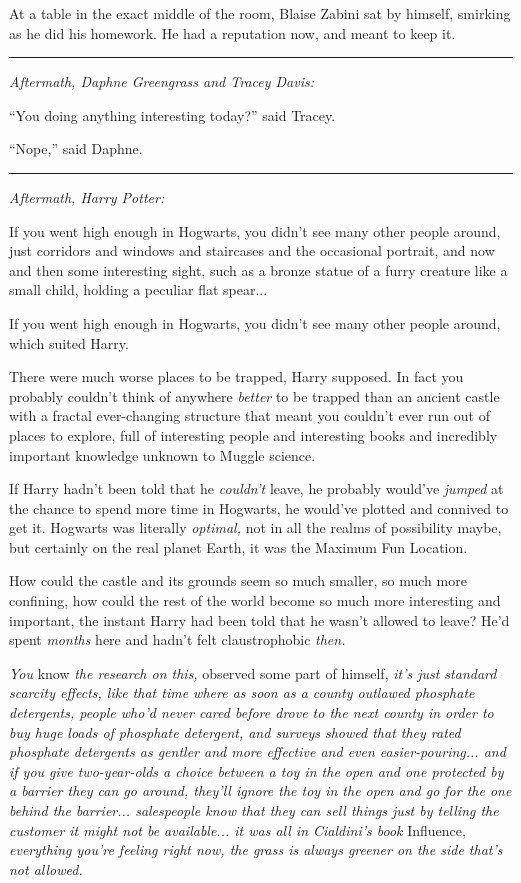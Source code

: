 At a table in the exact middle of the room, Blaise Zabini sat by himself, smirking as he did his homework. He had a reputation now, and meant to keep it.

\begin{center}\rule{3in}{0.4pt}\end{center}

\emph{Aftermath, Daphne Greengrass and Tracey Davis:}

``You doing anything interesting today?'' said Tracey.

``Nope,'' said Daphne.

\begin{center}\rule{3in}{0.4pt}\end{center}

\emph{Aftermath, Harry Potter:}

If you went high enough in Hogwarts, you didn't see many other people around, just corridors and windows and staircases and the occasional portrait, and now and then some interesting sight, such as a bronze statue of a furry creature like a small child, holding a peculiar flat spear...

If you went high enough in Hogwarts, you didn't see many other people around, which suited Harry.

There were much worse places to be trapped, Harry supposed. In fact you probably couldn't think of anywhere \emph{better} to be trapped than an ancient castle with a fractal ever-changing structure that meant you couldn't ever run out of places to explore, full of interesting people and interesting books and incredibly important knowledge unknown to Muggle science.

If Harry hadn't been told that he \emph{couldn't} leave, he probably would've \emph{jumped} at the chance to spend more time in Hogwarts, he would've plotted and connived to get it. Hogwarts was literally \emph{optimal,} not in all the realms of possibility maybe, but certainly on the real planet Earth, it was the Maximum Fun Location.

How could the castle and its grounds seem so much smaller, so much more confining, how could the rest of the world become so much more interesting and important, the instant Harry had been told that he wasn't allowed to leave? He'd spent \emph{months} here and hadn't felt claustrophobic \emph{then.}

\emph{You} know \emph{the research on this,} observed some part of himself, \emph{it's just standard scarcity effects, like that time where as soon as a county outlawed phosphate detergents, people who'd never cared before drove to the next county in order to buy huge loads of phosphate detergent, and surveys showed that they rated phosphate detergents as gentler and more effective and even easier-pouring... and if you give two-year-olds a choice between a toy in the open and one protected by a barrier they can go around, they'll ignore the toy in the open and go for the one behind the barrier... salespeople know that they can sell things just by telling the customer it might not be available... it was all in Cialdini's book} Influence, \emph{everything you're feeling right now, the grass is always greener on the side that's not allowed.}

